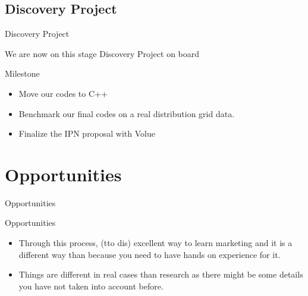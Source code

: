 \documentclass[12pt]{beamer}
\begin{document}
\subsection{Discovery Project}
\begin{frame}{Discovery Project}
\begin{block}{
We are now on this stage}
Discovery Project on board
\end{block}
\begin{alertblock}{Milestone}
\begin{itemize}
\item Move our codes to C++
\item Benchmark our final codes on a real distribution grid data.
\item Finalize the IPN proposal with Volue
\end{itemize}
\end{alertblock}
\end{frame}
\section{Opportunities}
\begin{frame}{Opportunities}
\begin{alertblock}{Opportunities}
\begin{itemize}
\item Through this process, (tto dis) excellent way to learn marketing and it is a different way than because you need to have hands on experience for it.
\item Things are different in real cases than research as there might be some details you have not taken into account before.
\end{itemize}
\end{alertblock}
\end{frame}
\end{document}
